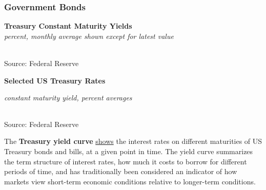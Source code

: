 \documentclass{report}
\makeatletter
\newcommand{\tbllink}[1]{\href{https://raw.githubusercontent.com/bdecon/US-chartbook/master/chartbook/data/#1}{\faTable}}
\newcommand*\short[1]{\expandafter\@gobbletwo\number\numexpr#1\relax}
\newcommand{\absnode}[3]{\node[below right, align=left] at (axis cs: #1,#2) {#3};}
\newcommand{\dateaxisticks}{
		date coordinates in=x, axis line style={draw=none},
		xmax={2022-03-15},
		max space between ticks=40,	    
		xtick={{1990-01-01}, {1992-01-01}, {1994-01-01}, 
			{1996-01-01}, {1998-01-01}, {2000-01-01}, 
			{2002-01-01}, {2004-01-01}, {2006-01-01},
			{2008-01-01}, {2010-01-01}, {2012-01-01}, {2014-01-01},
		    {2016-01-01}, {2018-01-01}, {2020-01-01}, {2022-01-01}, 
		    {2024-01-01}, {2026-01-01}},
		minor xtick={{1989-01-01}, {1991-01-01}, {1993-01-01},
			{1995-01-01}, {1997-01-01}, {1999-01-01}, 
			{2001-01-01}, {2003-01-01}, {2005-01-01}, {2007-01-01},
		    {2009-01-01}, {2011-01-01}, {2013-01-01}, {2015-01-01},
		    {2017-01-01}, {2019-01-01}, {2021-01-01}, {2023-01-01}, 
		    {2025-01-01}, {2027-01-01}},
		enlarge y limits={0.06}, enlarge x limits={0.01},
		}
\newcommand{\bbar}[2]{extra #1 ticks = {{#2}}, extra #1 tick labels = ,
		extra #1 tick style = {grid=major, grid style={thick, black!25}},}
\newcommand{\stdline}[4]{\addplot[very thick, no markers, color=#1] 
		table [x=#2, y=#3, col sep=comma] {#4};	}
\newcommand{\rbars}{
		\fill[color=black!10] (axis cs:{1990-07-01},\pgfkeysvalueof{/pgfplots/ymin}) rectangle 
			(axis cs:{1991-03-01}, \pgfkeysvalueof{/pgfplots/ymax});
		\fill[color=black!10] (axis cs:{2007-12-01},\pgfkeysvalueof{/pgfplots/ymin}) rectangle 
			(axis cs:{2009-07-01}, \pgfkeysvalueof{/pgfplots/ymax});
		\fill[color=black!10] (axis cs:{2001-03-01},\pgfkeysvalueof{/pgfplots/ymin}) rectangle 
			(axis cs:{2001-11-01}, \pgfkeysvalueof{/pgfplots/ymax});
		\fill[color=black!10] (axis cs:{2020-02-01},\pgfkeysvalueof{/pgfplots/ymin}) rectangle 
			(axis cs:{2020-05-01}, \pgfkeysvalueof{/pgfplots/ymax});}
\makeatother
\begin{document}
{{\begin{minipage}{0.76\textwidth}
\subsubsection*{Government Bonds}
\small  
\vspace{1mm}

\normalsize \textbf{Treasury Constant Maturity Yields}\\
\footnotesize{\textit{percent, monthly average shown except for latest value }}\\
\hspace*{-2mm} \\
\footnotesize{Source: Federal Reserve} \hfill \tbllink{rates.csv}
\vspace{3mm}

\normalsize \textbf{Selected US Treasury Rates}\\
\footnotesize{\textit{constant maturity yield, percent \hspace{18mm}averages}\\
\hspace*{-3mm}  \setlength{\tabcolsep}{2.0pt} \color{black!90}
		{\renewcommand{\arraystretch}{1.6}
\begin{tabular}{p{17mm} R{10.2mm} R{10.2mm} R{10.2mm} R{9.5mm}
		 		 R{9.5mm} R{9.5mm} R{9.5mm} R{9.5mm} R{9.5mm}}
			  \hline
		\end{tabular}}}

\vspace{-2mm}		
\footnotesize{Source: Federal Reserve}
\end{minipage}
\newpage
\begin{minipage}{0.76\textwidth}
\small The \textbf{Treasury yield curve} \href{https://www.treasury.gov/resource-center/data-chart-center/interest-rates/Pages/TextView.aspx?data=yield}{shows} the interest rates on different maturities of US Treasury bonds and bills, at a given point in time. The yield curve summarizes the term structure of interest rates, how much it costs to borrow for different periods of time, and has traditionally been considered an indicator of how markets view short-term economic conditions relative to longer-term conditions. 


\end{minipage}}}
\end{document}
